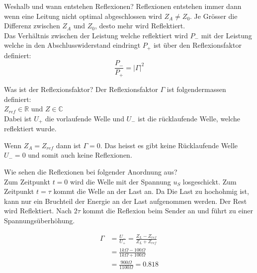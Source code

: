 \begin{karte}{Weshalb und wann entstehen Reflexionen?}
	Reflexionen entstehen immer dann wenn eine Leitung nicht optimal abgeschlossen wird $Z_A \ne Z_0$. Je Grösser die Differenz zwischen $Z_A$ und $Z_0$, desto mehr wird Reflektiert.\\
	Das Verhältnis zwischen der Leistung welche reflektiert wird $P_{-}$ mit der Leistung welche in den Abschlusswiderstand eindringt $P_{+}$ ist über den Reflexionsfaktor definiert:
	\begin{equation*}
	\frac{P_{-}}{P_{+}}=|\Gamma|^{2}
	\end{equation*}
\end{karte}

\begin{karte}{Was ist der Reflexionsfaktor?}
	Der Reflexionsfaktor $\Gamma$ ist folgendermassen definiert:\\
	 \quad $Z_{ref} \in \mathbb{R}$ und $Z \in \mathbb{C}$\\[5pt]
	Dabei ist $U_+$ die vorlaufende Welle und $U_-$ ist die rücklaufende Welle, welche reflektiert wurde.\\
	\begin{minipage}{0.49\textwidth}
		\scalebox{.7}{}
	\end{minipage}
	\begin{minipage}{0.49\textwidth}
		Wenn $Z_A = Z_{ref}$ dann ist $\Gamma = 0$. Das heisst es gibt keine Rücklaufende Welle $U_- = 0$ und somit auch keine Reflexionen.
	\end{minipage}
	
\end{karte}

\begin{karte}{Wie sehen die Reflexionen bei folgender Anordnung aus?\\
	\scalebox{.8}{}}
	Zum Zeitpunkt $t=0$ wird die Welle mit der Spannung $u_S$ losgeschickt. Zum Zeitpunkt $t=\tau$ kommt die Welle an der Last an. Da Die Last zu hochohmig ist, kann nur ein Bruchteil der Energie an der Last aufgenommen werden. Der Rest wird Reflektiert. Nach $2\tau$ kommt die Reflexion beim Sender an und führt zu einer Spannungsüberhöhung.\\
	\begin{minipage}{0.59\textwidth}
		\scalebox{.75}{}
	\end{minipage}
	\begin{minipage}{0.39\textwidth}
		\begin{align*}
			\Gamma &= \frac{U_-}{U_+} = \frac{Z_L-Z_{ref}}{Z_L+Z_{ref}}\\
			&= \frac{1k\Omega-100\Omega}{1k\Omega+100\Omega}\\
			&= \frac{900\Omega}{1100\Omega} = 0.818
		\end{align*}
	\end{minipage}
\end{karte}

